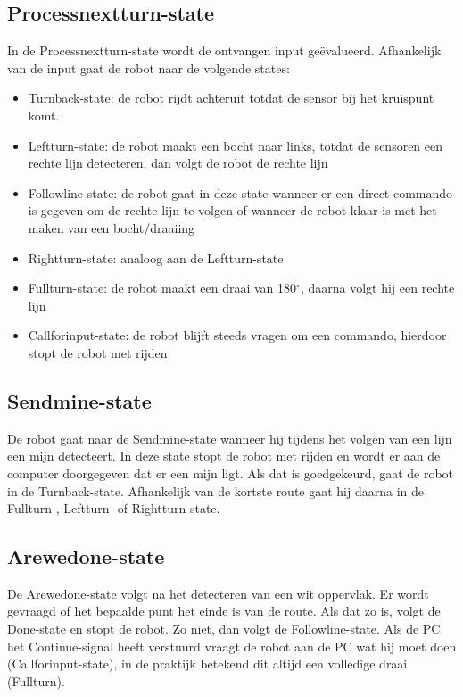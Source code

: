 \documentclass{report}
\begin{document}
\subsection{Processnextturn-state}
In de Processnextturn-state wordt de ontvangen input geëvalueerd.
Afhankelijk van de input gaat de robot naar de volgende states:
\begin{itemize}
\item Turnback-state: de robot rijdt achteruit totdat de sensor bij het kruispunt komt.
\item Leftturn-state: de robot maakt een bocht naar links, totdat de sensoren een rechte lijn detecteren, dan volgt de robot de rechte lijn
\item Followline-state: de robot gaat in deze state wanneer er een direct commando is gegeven om de rechte lijn te volgen of wanneer de robot klaar is met het maken van een bocht/draaiing
\item Rightturn-state: analoog aan de Leftturn-state
\item Fullturn-state: de robot maakt een draai van 180$^\circ$, daarna volgt hij een rechte lijn
\item Callforinput-state: de robot blijft steeds vragen om een commando, hierdoor stopt de robot met rijden
\end{itemize}

\subsection{Sendmine-state}
De robot gaat naar de Sendmine-state wanneer hij tijdens het volgen van een lijn een mijn detecteert.
In deze state stopt de robot met rijden en wordt er aan de computer doorgegeven dat er een mijn ligt.
Als dat is goedgekeurd, gaat de robot in de Turnback-state. Afhankelijk van de kortste route gaat hij daarna in de Fullturn-, Leftturn- of Rightturn-state. 

\subsection{Arewedone-state}
De Arewedone-state volgt na het detecteren van een wit oppervlak.
Er wordt gevraagd of het bepaalde punt het einde is van de route.
Als dat zo is, volgt de Done-state en stopt de robot.
Zo niet, dan volgt de Followline-state.
Als de PC het Continue-signal heeft verstuurd vraagt de robot aan de PC wat hij moet doen (Callforinput-state), in de praktijk betekend dit altijd een volledige draai (Fullturn).
\end{document}
